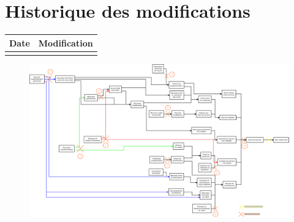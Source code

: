 \section*{Historique des modifications}
\begin{table}[H]
\centering
	\begin{tabularx}{16.8cm}{|X|X|}
	\hline
	Date & Modification \\
	\hline
	  & \\
	\hline
	\end{tabularx}
\end{table}
\newpage

\begin{landscape}
\begin{figure}
	\centering
	\includegraphics[scale=0.35]{images/AnalyseRisque_nPourquoi_FDR001.png}
\end{figure}
\end{landscape}